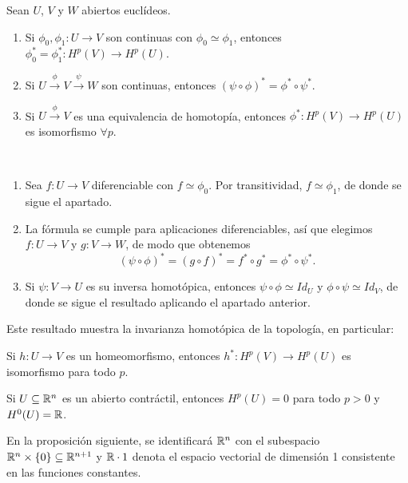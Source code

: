 \documentclass[CV.tex]{subfiles}
\begin{document}
\begin{teorema}\label{6.8}
Sean $U$, $V$ y $W$ abiertos euclídeos.
\begin{enumerate}
\item Si $\phi_0,\phi_1:U\to V$ son continuas con $\phi_0\simeq \phi_1$, entonces $\phi_0^*=\phi_1^*:H^p(V)\to H^p(U)$.
\item Si $U\overset{\phi}{\to}V\overset{\psi}{\to}W$ son continuas, entonces $(\psi\circ\phi)^*=\phi^*\circ\psi^*$.
\item Si $U\overset{\phi}{\to}V$ es una equivalencia de homotopía, entonces $\phi^*:H^p(V)\to H^p(U)$ es isomorfismo $\forall p$.
\end{enumerate}
\end{teorema}
\begin{dem}\
\begin{enumerate}
\item Sea $f:U\to V$ diferenciable con $f\simeq\phi_0$. Por transitividad, $f\simeq\phi_1$, de donde se sigue el apartado.
\item La fórmula se cumple para aplicaciones diferenciables, así que elegimos $f:U\to V$ y $g:V\to W$, de modo que obtenemos 
\[
(\psi\circ\phi)^*=(g\circ f)^*=f^*\circ g^*=\phi^*\circ\psi^*.
\]
\item Si $\psi:V\to U$ es su inversa homotópica, entonces $\psi\circ\phi\simeq Id_U$ y $\phi\circ\psi\simeq Id_V$, de donde se sigue el resultado aplicando el apartado anterior.
\end{enumerate}
\QED
\end{dem}

Este resultado muestra la invarianza homotópica de la topología, en particular:

\begin{coro}\label{6.9} 
Si $h:U\to V$ es un homeomorfismo, entonces $h^*:H^p(V)\to H^p(U)$ es isomorfismo para todo $p$.
\end{coro}

\begin{coro}
Si $U\subseteq\mathbb{R}^n$ es un abierto contráctil, entonces $H^p(U)=0$ para todo $p>0$ y $H^0(U)=\mathbb{R}$. 
\end{coro}

En la proposición siguiente, se identificará $\mathbb{R}^n$ con el subespacio $\mathbb{R}^n\times\{0\}\subseteq\mathbb{R}^{n+1}$ y $\mathbb{R}\cdot 1$ denota el espacio vectorial de dimensión 1 consistente en las funciones constantes.
\end{document}
